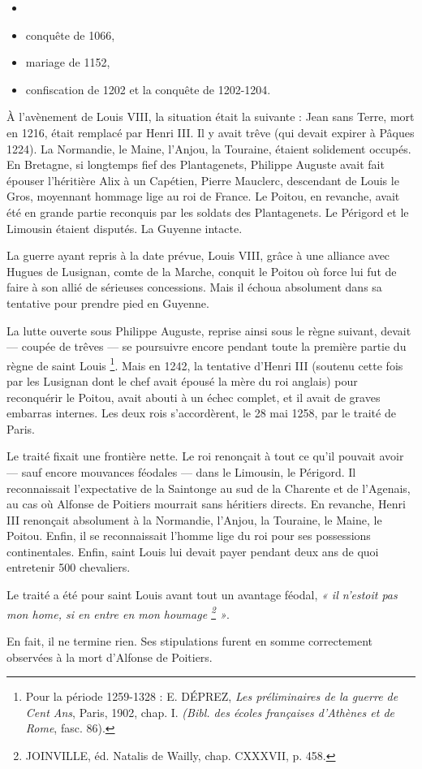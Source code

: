 \documentclass[french,twoside]{book} %
\begin{document}
\begin{itemize}[itemsep=0pt,]
\item[] \hspace{-1.5em}{\bfseries Les événements antérieurs doivent être rappelés en deux mots :}
\item conquête de 1066,
\item mariage de 1152,
\item confiscation de 1202 et la conquête de 1202-1204.
\end{itemize}
\noindent À l’avènement de Louis VIII, la situation était la suivante : Jean sans Terre, mort en 1216, était remplacé par Henri III. Il y avait trêve (qui devait expirer à Pâques 1224). La Normandie, le Maine, l’Anjou, la Touraine, étaient solidement occupés. En Bretagne, si longtemps fief des Plantagenets, Philippe Auguste avait fait épouser l’héritière Alix à un Capétien, Pierre Mauclerc, descendant de Louis le Gros, moyennant hommage lige au roi de France. Le Poitou, en revanche, avait été en grande partie reconquis par les soldats des Plantagenets. Le Périgord et le Limousin étaient disputés. La Guyenne intacte.\par
La guerre ayant repris à la date prévue, Louis VIII, grâce à une alliance avec Hugues de Lusignan, comte de la Marche, conquit le Poitou où force lui fut de faire à son allié de sérieuses concessions. Mais il échoua absolument dans sa tentative pour prendre pied en Guyenne.\par
La lutte ouverte sous Philippe Auguste, reprise ainsi sous le règne suivant, devait — coupée de trêves — se poursuivre encore pendant toute la première partie du règne de saint Louis \footnote{ Pour la période 1259-1328 : E. DÉPREZ, {\itshape Les préliminaires de la guerre de Cent Ans}, Paris, 1902, chap. I. {\itshape (Bibl. des écoles françaises d’Athènes et de Rome}, fasc. 86).}. Mais en 1242, la tentative d’Henri III (soutenu cette fois par les Lusignan dont le chef avait épousé la mère du roi anglais) pour reconquérir le Poitou, avait abouti à un échec complet, et il avait de graves embarras internes. Les deux rois s’accordèrent, le 28 mai 1258, par le traité de Paris.\par
Le traité fixait une frontière nette. Le roi renonçait à tout ce qu’il pouvait avoir — sauf encore mouvances féodales — dans le Limousin, le Périgord. Il reconnaissait l’expectative de la Saintonge au sud de la Charente et de l’Agenais, au cas où Alfonse de Poitiers mourrait sans héritiers directs. En revanche, Henri III renonçait absolument à la Normandie, l’Anjou, la Touraine, le Maine, le Poitou. Enfin, il se reconnaissait l’homme lige du roi pour ses possessions continentales. Enfin, saint Louis lui devait payer pendant deux ans de quoi entretenir 500 chevaliers.\par
\label{p23} Le traité a été pour saint Louis avant tout un avantage féodal, \emph{« il n’estoit pas mon home, si en entre en mon houmage \footnote{JOINVILLE, éd. Natalis de Wailly, chap. CXXXVII, p. 458.} »}.\par
En fait, il ne termine rien. Ses stipulations furent en somme correctement observées à la mort d’Alfonse de Poitiers.\par
\end{document}
